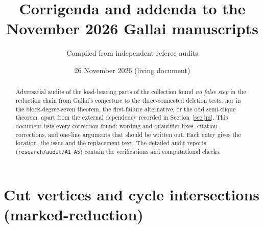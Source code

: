 \documentclass[11pt]{amsart}
\title{Corrigenda and addenda to the November 2026 Gallai manuscripts}
\author{Compiled from independent referee audits}
\date{26 November 2026 (living document)}
\begin{document}
\begin{abstract}
Adversarial audits of the load-bearing parts of the collection found \emph{no false step} in the
reduction chain from Gallai's conjecture to the three-connected deletion tests, nor in the
block-degree-seven theorem, the first-failure alternative, or the odd semi-clique theorem, apart
from the external dependency recorded in Section~\ref{sec:jm}. This document lists every correction
found: wording and quantifier fixes, citation corrections, and one-line arguments that should be
written out. Each entry gives the location, the issue and the replacement text. The detailed audit
reports (\texttt{research/audit/A1}--\texttt{A5}) contain the verifications and computational checks.
\end{abstract}
\maketitle

\section{Cut vertices and cycle intersections (marked-reduction)}
\end{document}
